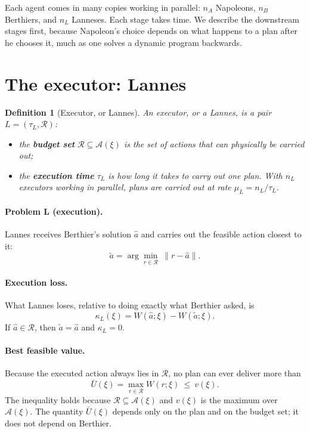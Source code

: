 \documentclass[11pt]{article}
\newcommand{\Nap}{\textcolor{nap}{Napoleon}}
\newcommand{\Ber}{\textcolor{ber}{Berthier}}
\newcommand{\Lan}{\textcolor{lan}{Lannes}}
\newtheorem{definition}{Definition}
\theoremstyle{remark}
\newcommand{\Rcal}{\mathcal{R}}
\newcommand{\Acal}{\mathcal{A}}
\begin{document}
Each agent comes in many copies working in parallel: $n_A$ Napoleons, $n_B$ Berthiers, and $n_L$ Lanneses. Each stage takes time. We describe the downstream stages first, because \Nap's choice depends on what happens to a plan after he chooses it, much as one solves a dynamic program backwards.

\section{\texorpdfstring{The executor: \Lan}{The executor: Lannes}}

\setcounter{definition}{2}\begin{definition}[Executor, or \Lan]\label{def:lannes}
An executor, or a \Lan, is a pair $L=(\tau_L,\Rcal)$:
\begin{itemize}
  \item the \textbf{budget set} $\Rcal\subseteq\Acal(\xi)$ is the set of actions that can physically be carried out;
  \item the \textbf{execution time} $\tau_L$ is how long it takes to carry out one plan. With $n_L$ executors working in parallel, plans are carried out at rate $\mu_L=n_L/\tau_L$.
\end{itemize}
\end{definition}

\paragraph{Problem L (execution).} \Lan{} receives \Ber's solution $\hat a$ and carries out the feasible action closest to it:
\begin{equation}\label{eq:lannes}
\tilde a=\arg\min_{r\in\Rcal}\ \lVert r-\hat a\rVert.
\end{equation}

\paragraph{Execution loss.} What \Lan{} loses, relative to doing exactly what \Ber{} asked, is
\begin{equation}\label{eq:kappaL}
\kappa_L(\xi)=W(\hat a;\xi)-W(\tilde a;\xi).
\end{equation}
If $\hat a\in\Rcal$, then $\tilde a=\hat a$ and $\kappa_L=0$.

\paragraph{Best feasible value.} Because the executed action always lies in $\Rcal$, no plan can ever deliver more than
\begin{equation}\label{eq:Ubar}
\bar U(\xi)=\max_{r\in\Rcal}W(r;\xi)\ \le\ v(\xi).
\end{equation}
The inequality holds because $\Rcal\subseteq\Acal(\xi)$ and $v(\xi)$ is the maximum over $\Acal(\xi)$. The quantity $\bar U(\xi)$ depends only on the plan and on the budget set; it does not depend on \Ber.
\end{document}
